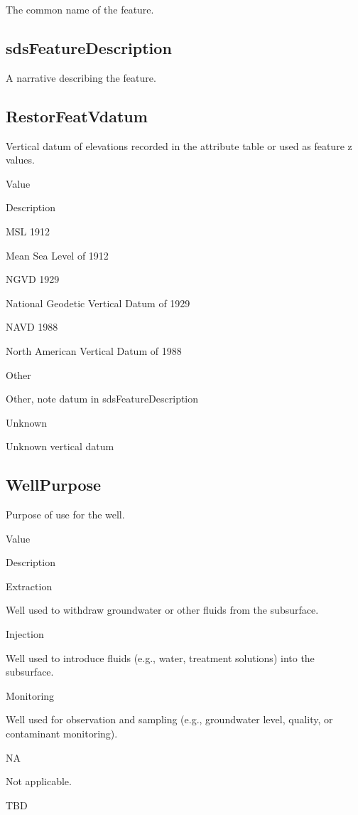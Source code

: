 \documentclass[
  letterpaper,
  DIV=11,
  numbers=noendperiod]{scrreprt}
\begin{document}
The common name of the feature.

\subsection{sdsFeatureDescription}\label{sdsfeaturedescription-15}

A narrative describing the feature.

\subsection{RestorFeatVdatum}\label{restorfeatvdatum-15}

Vertical datum of elevations recorded in the attribute table or used as
feature z values.

Value

Description

MSL 1912

Mean Sea Level of 1912

NGVD 1929

National Geodetic Vertical Datum of 1929

NAVD 1988

North American Vertical Datum of 1988

Other

Other, note datum in sdsFeatureDescription

Unknown

Unknown vertical datum

\subsection{WellPurpose}\label{wellpurpose}

Purpose of use for the well.

Value

Description

Extraction

Well used to withdraw groundwater or other fluids from the subsurface.

Injection

Well used to introduce fluids (e.g., water, treatment solutions) into
the subsurface.

Monitoring

Well used for observation and sampling (e.g., groundwater level,
quality, or contaminant monitoring).

NA

Not applicable.

TBD
\end{document}
